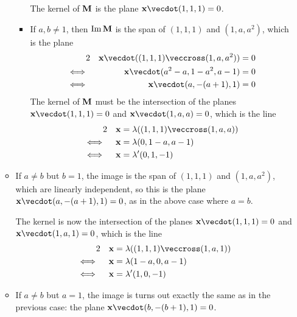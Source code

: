 \documentclass[fleqn,a4paper,11pt]{article}
\begin{document}
\begin{enumerate}[label=\textbf{\arabic*.}]
\begin{itemize}
\begin{itemize}
       The kernel of \(\mathbf{M}\) is the plane \(\vec x \vecdot (1, 1, 1) = 0\).
      \item
       If \(a, b \ne 1\), then \(\operatorname{Im} \mathbf{M}\) is the span of
       \((1, 1, 1)\) and \((1, a, a^2)\), which is the plane
       \begin{alignat*}2
        && \vec x \vecdot ((1, 1, 1) \veccross (1, a, a^2)) &= 0 \\
        \iff{}&& \vec x \vecdot (a^2 - a, 1 - a^2, a - 1) &= 0 \\
        \iff{}&& \vec x \vecdot (a, -(a + 1), 1) &= 0
       \end{alignat*}
       The kernel of \(\mathbf{M}\) must be the intersection of the planes
       \(\vec x \vecdot (1, 1, 1) = 0\) and \(\vec x \vecdot(1, a, a) = 0\),
       which is the line
       \begin{alignat*}2
        && \vec x &= \lambda ((1, 1, 1) \veccross (1, a, a)) \\
        \iff{}&& \vec x &= \lambda (0, 1 - a, a - 1) \\
        \iff{}&& \vec x &= \lambda' (0, 1, -1)
       \end{alignat*}
     \end{itemize}
    \item
     If \(a \ne b\) but \(b = 1\), the image is the span of
     \((1, 1, 1)\) and \((1, a, a^2)\), which are linearly independent, so this
     is the plane \(\vec x \vecdot (a, -(a + 1), 1) = 0\), as in the above case
     where \(a = b\).

     The kernel is now the intersection of the planes
     \(\vec x \vecdot (1, 1, 1) = 0\) and \(\vec x \vecdot (1, a, 1) = 0\),
     which is the line
     \begin{alignat*}2
      &&\vec x &= \lambda((1, 1, 1) \veccross (1, a, 1)) \\
      \iff{}&&\vec x &= \lambda(1 - a, 0, a - 1) \\
      \iff{}&&\vec x &= \lambda'(1, 0, -1)
     \end{alignat*}
    \item
      If \(a \ne b\) but \(a = 1\), the image is turns out exactly the same as
      in the previous case: the plane
      \(\vec x \vecdot (b, -(b + 1), 1) = 0\).


\end{itemize}
\end{enumerate}
\end{document}
